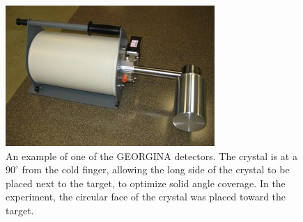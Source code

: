 \begin{figure}
    \centering
    \includegraphics{Setup_Figs/georgina_example.png}
    \caption{An example of one of the GEORGINA detectors. The crystal is at a $90^{\circ}$ from the cold finger, allowing the long side of the crystal to be placed next to the target, to optimize solid angle coverage. In the experiment, the circular face of the crystal was placed toward the target.}
    \label{fig:georgina}
\end{figure}